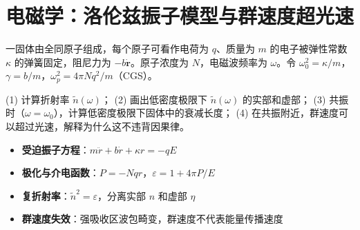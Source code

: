 \section{电磁学：洛伦兹振子模型与群速度超光速}
\label{sec:lorentz-oscillator}

\begin{modelbox}
一固体由全同原子组成，每个原子可看作电荷为 $q$、质量为 $m$ 的电子被弹性常数 $\kappa$ 的弹簧固定，阻尼力为 $-b\dot{\bm{r}}$。原子浓度为 $N$，电磁波频率为 $\omega$。令 $\omega_0^2=\kappa/m$，$\gamma=b/m$，$\omega_p^2=4\pi Nq^2/m$（CGS）。

(1) 计算折射率 $\tilde{n}(\omega)$；
(2) 画出低密度极限下 $\tilde{n}(\omega)$ 的实部和虚部；
(3) 共振时（$\omega=\omega_0$），计算低密度极限下固体中的衰减长度；
(4) 在共振附近，群速度可以超过光速，解释为什么这不违背因果律。
\end{modelbox}

\begin{tipbox}[考点快速分析]
\begin{itemize}
    \item \textbf{受迫振子方程}：$m\ddot{r}+b\dot{r}+\kappa r=-qE$
    \item \textbf{极化与介电函数}：$P=-Nqr$，$\varepsilon=1+4\pi P/E$
    \item \textbf{复折射率}：$\tilde{n}^2=\varepsilon$，分离实部 $n$ 和虚部 $\eta$
    \item \textbf{群速度失效}：强吸收区波包畸变，群速度不代表能量传播速度
\end{itemize}
\end{tipbox}

